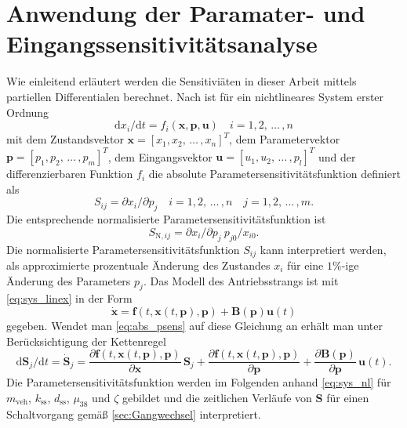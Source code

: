 \section{Anwendung der Paramater- und Eingangssensitivitätsanalyse}\label{sec:para_sens}
Wie einleitend erläutert werden die Sensitiviäten in dieser Arbeit mittels partiellen Differentialen berechnet. Nach \cite{Hearne.1985} ist für ein nichtlineares System erster Ordnung
\begin{equation}
\mathrm{d} x_i/\mathrm{d} t = f_i(\pmb{x},\pmb{p},\pmb{u})\quad i=1,2,\,\dots\, ,n 
\end{equation}
mit dem Zustandsvektor $\pmb{x} = [x_1, x_2,\, \dots\, ,x_n]^T$, dem Parametervektor $\pmb{p} = [p_1, p_2,\, \dots\, ,p_m]^T$, dem Eingangsvektor $\pmb{u} = [u_1, u_2,\, \dots\, ,p_l]^T$ und der differenzierbaren Funktion $f_i$ die absolute Parametersensitivitätsfunktion definiert als
\begin{equation}\label{eq:abs_psens}
S_{ij} = \partial x_i/\partial p_j \quad i=1,2,\,\dots\, ,n \quad j=1,2,\,\dots\, ,m.
\end{equation}
Die entsprechende normalisierte Parametersensitivitätsfunktion ist 
\begin{equation}
S_{\mathrm{N},ij} = \partial x_i/\partial p_j\ p_{j0}/x_{i0}.
\end{equation}
Die normalisierte Parametersensitivitätsfunktion $S_{ij}$ kann interpretiert werden, als approximierte prozentuale Änderung des Zustandes $x_i$ für eine $1\%$-ige Änderung des Parameters $p_j$. Das Modell des Antriebsstrangs ist mit \eqref{eq:sys_linex} in der Form
\begin{equation}
\dot{\pmb{x}} = \pmb{f}(t,\pmb{x}(t,\pmb{p}),\pmb{p})+ \pmb{B}(\pmb{p})\pmb{u}(t) 
\end{equation} 
gegeben. Wendet man \eqref{eq:abs_psens} auf diese Gleichung an erhält man unter Berücksichtigung der Kettenregel
\begin{equation}\label{eq:Sens_eq}
\mathrm{d} \pmb{S}_j/\mathrm{d} t = \dot{\pmb{S}}_j= \frac{\partial\pmb{f}(t,\pmb{x}(t,\pmb{p}),\pmb{p})}{\partial \pmb{x}}\,\pmb{S}_j+\frac{\partial\pmb{f}(t,\pmb{x}(t,\pmb{p}),\pmb{p})}{\partial \pmb{p}}+\frac{\partial \pmb{B}(\pmb{p})}{\partial \pmb{p}}\,\pmb{u}(t).
\end{equation}
Die Parametersensitivitätsfunktion werden im Folgenden anhand \eqref{eq:sys_nl} für $m_\mathrm{veh}$, $k_\mathrm{ss}$, $d_\mathrm{ss}$, $\mu_{38}$ und $\zeta$ gebildet und die zeitlichen Verläufe von $\pmb{S}$ für einen Schaltvorgang gemäß \ref{sec:Gangwechsel} interpretiert.

